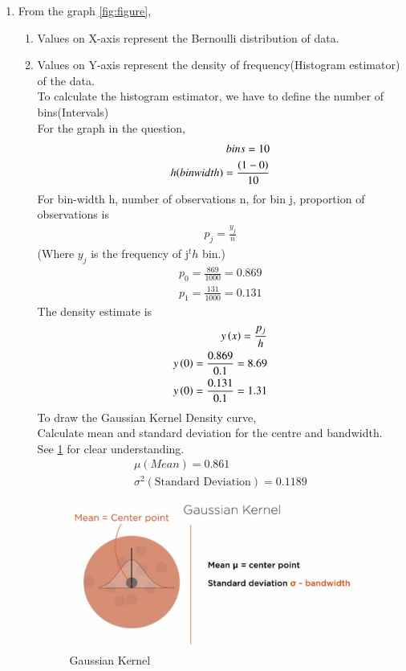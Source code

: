 \renewcommand{\theequation}{\theenumi}
\begin{enumerate}[label=\arabic*.,ref=\thesubsubsection.\theenumi]
\item From the graph \eqref{fig:figure},
\begin{enumerate}
\item Values on X-axis represent the Bernoulli distribution of data.
\item Values on Y-axis represent the density of frequency(Histogram estimator) of the data.
\\
To calculate the histogram estimator, we have to define the number of bins(Intervals)
\\
For the graph in the question,
\begin{align}
bins=10
\\
\label{h}
h(binwidth)=\frac{\left(1-0\right)}{10}
\end{align}
For bin-width h, number of observations n, for bin j, proportion of observations is
\begin{align}
p_j=\frac{y_j}{n}
\end{align}
(Where $y_j$ is the frequency of j$^th$ bin.)
\begin{align}
p_0=\frac{869}{1000}=0.869
\\
p_1=\frac{131}{1000}=0.131
\end{align}
The density estimate is
\label{understandingcurve}
\begin{align}
y\left(x\right)=\frac{p_j}{h}
\\
y\left(0\right)=\frac{0.869}{0.1}=8.69
\\
y\left(0\right)=\frac{0.131}{0.1}=1.31
\end{align}
To draw the Gaussian Kernel Density curve,
\\
Calculate mean and standard deviation for the centre and bandwidth.
\\
See \ref{fig:fig} for clear understanding.
\begin{align}
\mu (Mean)=0.861
\\
\sigma^2 (\text{Standard Deviation})=0.1189
\end{align}
\begin{figure}[!ht]
\centering
\includegraphics[width=\columnwidth]{./prob/figs/gaus_kernel.eps}
\caption{Gaussian Kernel}
\label{fig:fig}
\end{figure}

\end{enumerate}
\end{enumerate}